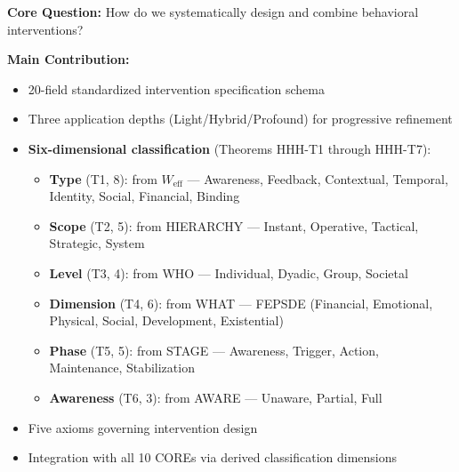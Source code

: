 \begin{tcolorbox}[colback=green!10!white, colframe=green!75!black,
    title=\textbf{Appendix HHH: Summary}]

\textbf{Core Question:} How do we systematically design and combine behavioral interventions?

\textbf{Main Contribution:}
\begin{itemize}[nosep]
    \item 20-field standardized intervention specification schema
    \item Three application depths (Light/Hybrid/Profound) for progressive refinement
    \item \textbf{Six-dimensional classification} (Theorems HHH-T1 through HHH-T7):
    \begin{itemize}[nosep]
        \item \textbf{Type} (T1, 8): from $W_{\text{eff}}$ --- Awareness, Feedback, Contextual, Temporal, Identity, Social, Financial, Binding
        \item \textbf{Scope} (T2, 5): from HIERARCHY --- Instant, Operative, Tactical, Strategic, System
        \item \textbf{Level} (T3, 4): from WHO --- Individual, Dyadic, Group, Societal
        \item \textbf{Dimension} (T4, 6): from WHAT --- FEPSDE (Financial, Emotional, Physical, Social, Development, Existential)
        \item \textbf{Phase} (T5, 5): from STAGE --- Awareness, Trigger, Action, Maintenance, Stabilization
        \item \textbf{Awareness} (T6, 3): from AWARE --- Unaware, Partial, Full
    \end{itemize}
    \item Five axioms governing intervention design
    \item Integration with all 10 COREs via derived classification dimensions
\end{itemize}


\end{tcolorbox}
